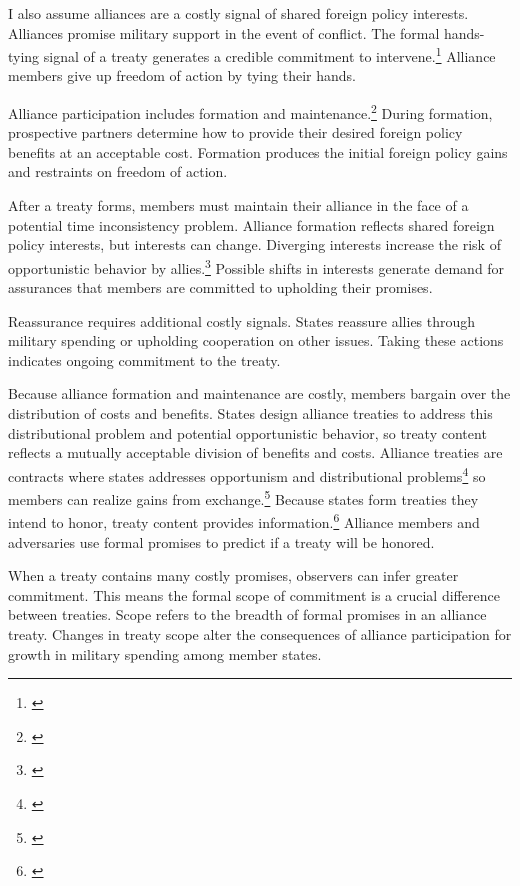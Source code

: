 \documentclass[12pt]{article}
\begin{document}
I also assume alliances are a costly signal of shared foreign policy interests. 
Alliances promise military support in the event of conflict. 
The formal hands-tying signal of a treaty generates a credible commitment to intervene.\footnote{\cite{Fearon1997, Leeds2003}}
Alliance members give up freedom of action by tying their hands.  


Alliance participation includes formation and maintenance.\footnote{\cite{Snyder1997}}
During formation, prospective partners determine how to provide their desired foreign policy benefits at an acceptable cost. 
Formation produces the initial foreign policy gains and restraints on freedom of action. 


After a treaty forms, members must maintain their alliance in the face of a potential time inconsistency problem. 
Alliance formation reflects shared foreign policy interests, but interests can change. 
Diverging interests increase the risk of opportunistic behavior by allies.\footnote{\cite{Leeds2003a, LeedsSavun2007}}
Possible shifts in interests generate demand for assurances that members are committed to upholding their promises. 


Reassurance requires additional costly signals. 
States reassure allies through military spending or upholding cooperation on other issues.
Taking these actions indicates ongoing commitment to the treaty. 


Because alliance formation and maintenance are costly, members bargain over the distribution of costs and benefits.
States design alliance treaties to address this distributional problem and potential opportunistic behavior, so treaty content reflects a mutually acceptable division of benefits and costs. 
Alliance treaties are contracts where states addresses opportunism and distributional problems\footnote{\cite{Williamson1985, Koremenosetal2001}} so members can realize gains from exchange.\footnote{\cite{Lake1996, Bensonetal2014}}
Because states form treaties they intend to honor, treaty content provides information.\footnote{\cite{Leeds2003}}
Alliance members and adversaries use formal promises to predict if a treaty will be honored.


When a treaty contains many costly promises, observers can infer greater commitment. 
This means the formal scope of commitment is a crucial difference between treaties.
Scope refers to the breadth of formal promises in an alliance treaty.
Changes in treaty scope alter the consequences of alliance participation for growth in military spending among member states. 
\end{document}
